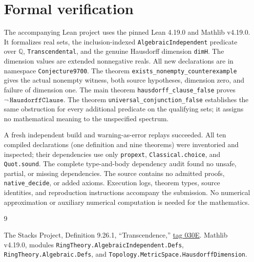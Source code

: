 \documentclass[11pt]{article}
\newcommand{\Q}{\mathbb{Q}}
\begin{document}
\section{Formal verification}
The accompanying Lean project uses the pinned Lean 4.19.0 and Mathlib v4.19.0.
It formalizes real sets, the inclusion-indexed \texttt{AlgebraicIndependent}
predicate over $\Q$, \texttt{Transcendental}, and the genuine Hausdorff dimension
\texttt{dimH}. The dimension values are extended nonnegative reals.
All new declarations are in namespace \texttt{Conjecture9700}.
The theorem \texttt{exists\_nonempty\_counterexample} gives the actual nonempty
witness, both source hypotheses, dimension zero, and failure of dimension one.
The main theorem \texttt{hausdorff\_clause\_false} proves
$\neg\,\texttt{HausdorffClause}$. The theorem
\texttt{universal\_conjunction\_false} establishes the same obstruction for every
additional predicate on the qualifying sets; it assigns no mathematical meaning
to the unspecified spectrum.

A fresh independent build and warning-as-error replays succeeded. All ten compiled
declarations (one definition and nine theorems) were inventoried and inspected;
their dependencies use only \texttt{propext}, \texttt{Classical.choice}, and
\texttt{Quot.sound}. The complete type-and-body dependency audit found no unsafe,
partial, or missing dependencies. The source contains no admitted proofs,
\texttt{native\_decide}, or added axioms. Execution logs, theorem types, source
identities, and reproduction instructions accompany the submission. No numerical
approximation or auxiliary numerical computation is needed for the mathematics.

\begin{thebibliography}{9}
\raggedright
{}
The Stacks Project, Definition 9.26.1, ``Transcendence,''
\href{https://stacks.math.columbia.edu/tag/030E}{tag 030E}.
Mathlib v4.19.0, modules
\texttt{RingTheory.AlgebraicIndependent.Defs},
\texttt{RingTheory.Algebraic.Defs}, and
\texttt{Topology.MetricSpace.HausdorffDimension}.
\end{thebibliography}
\end{document}
